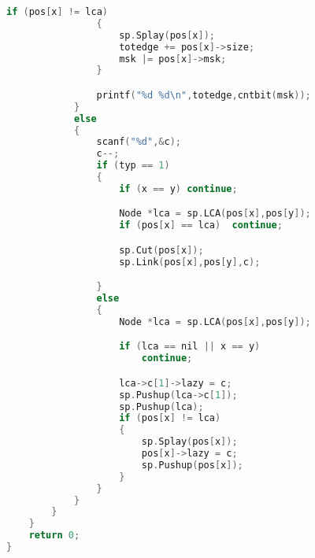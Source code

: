 \begin{lstlisting}[language=c++]
                if (pos[x] != lca)
                {
                    sp.Splay(pos[x]);
                    totedge += pos[x]->size;
                    msk |= pos[x]->msk;
                }

                printf("%d %d\n",totedge,cntbit(msk));
            }
            else
            {
                scanf("%d",&c);
                c--;
                if (typ == 1)
                {
                    if (x == y)	continue;

                    Node *lca = sp.LCA(pos[x],pos[y]);
                    if (pos[x] == lca)	continue;

                    sp.Cut(pos[x]);
                    sp.Link(pos[x],pos[y],c);

                }
                else
                {
                    Node *lca = sp.LCA(pos[x],pos[y]);

                    if (lca == nil || x == y)
                        continue;

                    lca->c[1]->lazy = c;
                    sp.Pushup(lca->c[1]);
                    sp.Pushup(lca);
                    if (pos[x] != lca)
                    {
                        sp.Splay(pos[x]);
                        pos[x]->lazy = c;
                        sp.Pushup(pos[x]);
                    }
                }
            }
        }
    }
    return 0;
}
        \end{lstlisting}